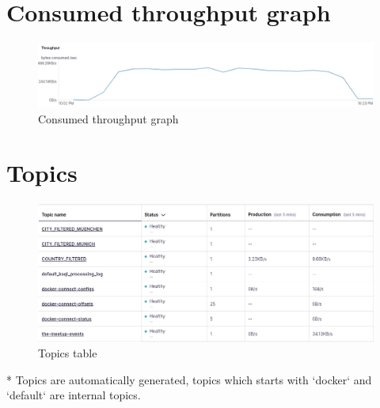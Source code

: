 \section{Consumed throughput graph}
\begin{figure}[H]
    \centerline{\includegraphics[scale=.4]{assets/appendices/throuhput-consumed.png}}
    \caption{Consumed throughput graph}
    \label{fig}
\end{figure}

\section{Topics}

\begin{figure}[H]
    \centerline{\includegraphics[scale=.4]{assets/appendices/topics-table.png}}
    \caption{Topics table}
    \label{fig}
\end{figure}

* Topics are automatically generated, topics which starts with `docker` and  `default` are internal topics.